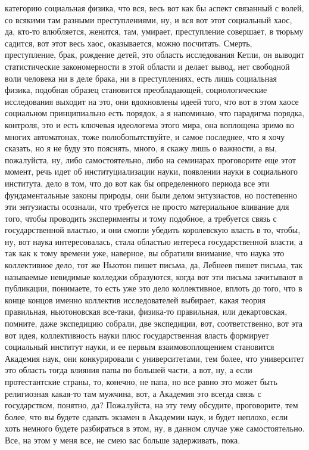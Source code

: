 категорию социальная физика, что вся, весь вот как бы аспект связанный с волей,
со всякими там разными преступлениями, ну, и вся вот этот социальный хаос, да,
кто-то влюбляется, женится, там, умирает, преступление совершает, в тюрьму
садится, вот этот весь хаос, оказывается, можно посчитать. Смерть, преступление,
брак, рождение детей, это область исследования Кетли, он выводит статистические
закономерности в этой области и делает вывод, нет свободной воли человека ни в
деле брака, ни в преступлениях, есть лишь социальная физика, подобная образец
становится преобладающей, социологические исследования выходит на это, они
вдохновлены идеей того, что вот в этом хаосе социальном принципиально есть
порядок, а я напоминаю, что парадигма порядка, контроля, это и есть ключевая
идеологема этого мира, она воплощена зримо во многих автоматонах, тоже
полюбопытствуйте, и самое последнее, что я хочу сказать, но я не буду это
пояснять, много, я скажу лишь о важности, а вы, пожалуйста, ну, либо
самостоятельно, либо на семинарах проговорите еще этот момент, речь идет об
институциализации науки, появлении науки в социального института, дело в том,
что до вот как бы определенного периода все эти фундаментальные законы природы,
они были делом энтузиастов, но постепенно эти энтузиасты осознали, что требуется
не просто материальное вливание для того, чтобы проводить эксперименты и тому
подобное, а требуется связь с государственной властью, и они смогли убедить
королевскую власть в то, чтобы, ну, вот наука интересовалась, стала областью
интереса государственной власти, а так как к тому времени уже, наверное, вы
обратили внимание, что наука это коллективное дело, тот же Ньютон пишет письма,
да, Лебнеев пишет письма, так называемые невидимые колледжи образуются, когда
вот эти письма зачитывают в публикации, понимаете, то есть уже это дело
коллективное, вплоть до того, что в конце концов именно коллектив исследователей
выбирает, какая теория правильная, ньютоновская все-таки, физика-то правильная,
или декартовская, помните, даже экспедицию собрали, две экспедиции, вот,
соответственно, вот эта вот идея, коллективность науки плюс государственная
власть формирует социальный институт науки, и ее первым взаимовоплощением
становится Академия наук, они конкурировали с университетами, тем более, что
университет это область тогда влияния папы по большей части, а вот, ну, а если
протестантские страны, то, конечно, не папа, но все равно это может быть
религиозная какая-то там мужчина, вот, а Академия это всегда связь с
государством, понятно, да? Пожалуйста, на эту тему обсудите, проговорите, тем
более, что вы будете сдавать экзамен в Академии наук, и будет неплохо, если хоть
немного будете разбираться в этом, ну, в данном случае уже самостоятельно. Все,
на этом у меня все, не смею вас больше задерживать, пока.
